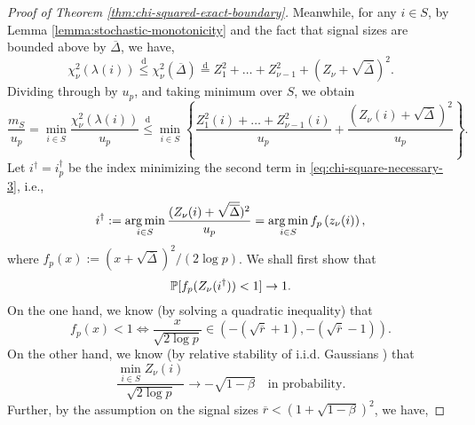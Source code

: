 \begin{proof}[Proof of Theorem \ref{thm:chi-squared-exact-boundary}]
Meanwhile, for any $i\in S$, by Lemma \ref{lemma:stochastic-monotonicity} and the fact that signal sizes are bounded above by $\overline{\Delta}$, we have,
\begin{equation*}
    {\chi_\nu^2(\lambda(i))} \stackrel{\mathrm{d}}{\le}
    {\chi_\nu^2(\overline{\Delta})} \stackrel{\mathrm{d}}{=} 
    {Z_1^2 + \ldots + Z_{\nu-1}^2 + \left(Z_\nu + \sqrt{\overline{\Delta}}\right)^2}.
\end{equation*}
Dividing through by $u_p$, and taking minimum over $S$, we obtain
\begin{equation} \label{eq:chi-square-necessary-3}
    \frac{m_S}{u_p} 
    = \min_{i\in S} \frac{\chi_\nu^2(\lambda(i))}{u_p} 
    \stackrel{\mathrm{d}}{\le} 
    \min_{i\in S}\left\{\frac{Z_1^2(i) + \ldots + Z_{\nu-1}^2(i)}{u_p} + \frac{(Z_\nu(i) + \sqrt{\overline{\Delta}})^2}{u_p}\right\}.
\end{equation}
Let $i^\dagger = i^\dagger_p$ be the index minimizing the second term in \eqref{eq:chi-square-necessary-3}, i.e.,
\begin{equation}
    i^\dagger := \argmin_{i\in S} \frac{(Z_\nu(i) + \sqrt{\overline{\Delta}})^2}{u_p}
    = \argmin_{i\in S} f_p\left(z_\nu(i)\right),
\end{equation}
where $f_p(x):=(x+\sqrt{\overline{\Delta}})^2/(2\log{p})$. 
We shall first show that 
\begin{equation} \label{eq:chi-square-necessary-4}
    \P[ f_p(Z_\nu(i^\dagger)) < 1 ] \to 1.
\end{equation}
On the one hand, we know (by solving a quadratic inequality) that
\begin{equation} \label{eq:chi-square-necessary-5}
    f_p(x)<1 \iff \frac{x}{\sqrt{2\log{p}}} \in (-(\sqrt{\overline{r}}+1), -(\sqrt{\overline{r}}-1)).
\end{equation}
On the other hand, we know (by relative stability of i.i.d. Gaussians \cite{gao2018fundamental}) that 
\begin{equation} \label{eq:chi-square-necessary-6}
    \frac{\min_{i\in S} Z_\nu(i)}{\sqrt{2\log{p}}}
    \to -\sqrt{1-\beta} \quad\text{in probability}.
\end{equation}
Further, by the assumption on the signal sizes $\overline{r} < (1+\sqrt{1-\beta})^2$, we have,

\end{proof}
